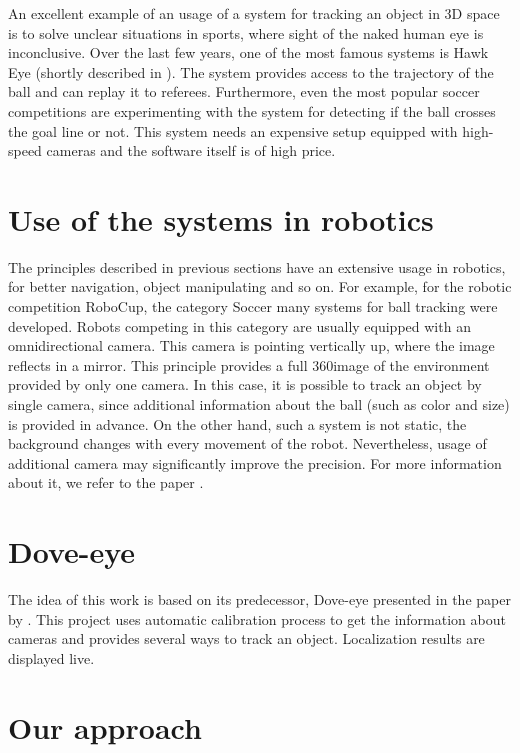 An excellent example of an usage of a system for tracking an object in 3D space
is to solve unclear situations in sports, where sight of the naked human
eye is inconclusive. Over the last few years, one of the most famous systems is
Hawk Eye (shortly described in \citet*{owens2003hawk}). The system provides
access to the trajectory of the ball and can replay it to referees.
Furthermore, even the most popular soccer competitions are experimenting with
the system for detecting if the ball crosses the goal line or not.  This system needs
an expensive setup equipped with high-speed cameras and the software itself is of
high price.

\section{Use of the systems in robotics}

The principles described in previous sections have an extensive usage in
robotics, for better navigation, object manipulating and so on. For example,
for the robotic competition
RoboCup, the category Soccer many systems for ball tracking were developed. Robots
competing in this category are usually equipped with an omnidirectional camera.
This camera is pointing vertically up, where the image reflects in a mirror.
This principle provides a full 360\degree image of the environment provided by
only one camera. In this case, it is possible to track an object by single
camera, since additional information about the ball (such as color and size)
is provided in advance. On the other hand, such a system is not static, the
background changes with every movement of the robot. Nevertheless, usage of
additional camera may significantly improve the precision. For more information
about it, we refer to the paper \citet*{kappeler20103d}.


\section{Dove-eye}

The idea of this work is based on its predecessor, Dove-eye presented in the
paper by \citet*{dove-eye}. This project uses automatic calibration process to
get the information about cameras and provides several ways to track an
object. Localization results are displayed live.

\section{Our approach}

